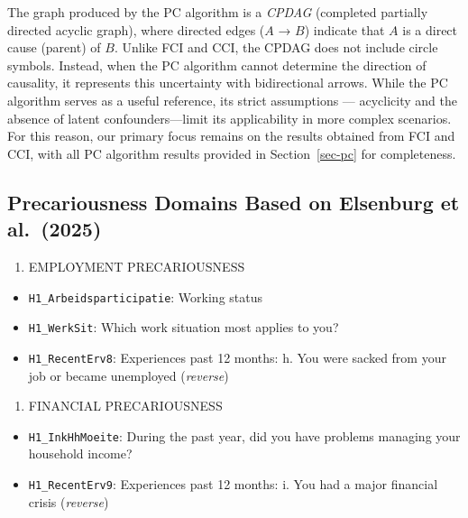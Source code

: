 \documentclass[
]{article}
\providecommand{\tightlist}{%
  \setlength{\itemsep}{0pt}\setlength{\parskip}{0pt}}\usepackage{longtable,booktabs,array}
\begin{document}
The graph produced by the PC algorithm is a \emph{CPDAG} (completed
partially directed acyclic graph), where directed edges (\(A\) → \(B\))
indicate that \(A\) is a direct cause (parent) of \(B\). Unlike FCI and
CCI, the CPDAG does not include circle symbols. Instead, when the PC
algorithm cannot determine the direction of causality, it represents
this uncertainty with bidirectional arrows. While the PC algorithm
serves as a useful reference, its strict assumptions --- acyclicity and
the absence of latent confounders---limit its applicability in more
complex scenarios. For this reason, our primary focus remains on the
results obtained from FCI and CCI, with all PC algorithm results
provided in Section~\ref{sec-pc} for completeness.

\subsection{Precariousness Domains Based on Elsenburg et
al.~(2025)}\label{precariousness-domains-based-on-elsenburg-et-al.-2025}

\begin{enumerate}
\def\labelenumi{\arabic{enumi}.}
\tightlist
\item
  EMPLOYMENT PRECARIOUSNESS
\end{enumerate}

\begin{itemize}
\tightlist
\item
  \texttt{H1\_Arbeidsparticipatie}: Working status
\item
  \texttt{H1\_WerkSit}: Which work situation most applies to you?
\item
  \texttt{H1\_RecentErv8}: Experiences past 12 months: h. You were
  sacked from your job or became unemployed (\emph{reverse})
\end{itemize}

\begin{enumerate}
\def\labelenumi{\arabic{enumi}.}
\setcounter{enumi}{1}
\tightlist
\item
  FINANCIAL PRECARIOUSNESS
\end{enumerate}

\begin{itemize}
\tightlist
\item
  \texttt{H1\_InkHhMoeite}: During the past year, did you have problems
  managing your household income?
\item
  \texttt{H1\_RecentErv9}: Experiences past 12 months: i. You had a
  major financial crisis (\emph{reverse})
\end{itemize}
\end{document}
